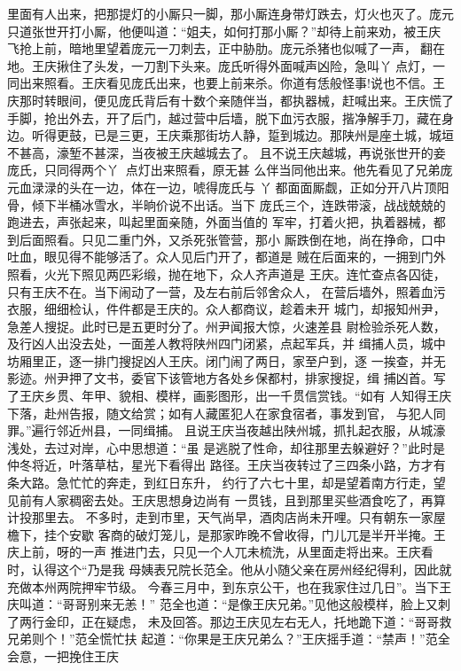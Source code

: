 里面有人出来，把那提灯的小厮只一脚，那小厮连身带灯跌去，灯火也灭了。庞元
只道张世开打小厮，他便叫道：“姐夫，如何打那小厮？”却待上前来劝，被王庆
飞抢上前，暗地里望着庞元一刀刺去，正中胁肋。庞元杀猪也似喊了一声，翻在
地。王庆揪住了头发，一刀割下头来。庞氏听得外面喊声凶险，急叫丫点灯，一
同出来照看。王庆看见庞氏出来，也要上前来杀。你道有恁般怪事!说也不信。王
庆那时转眼间，便见庞氏背后有十数个亲随伴当，都执器械，赶喊出来。王庆慌了
手脚，抢出外去，开了后门，越过营中后墙，脱下血污衣服，揩净解手刀，藏在身
边。听得更鼓，已是三更，王庆乘那街坊人静，踅到城边。那陕州是座土城，城垣
不甚高，濠堑不甚深，当夜被王庆越城去了。
且不说王庆越城，再说张世开的妾庞氏，只同得两个丫，点灯出来照看，原无甚
么伴当同他出来。他先看见了兄弟庞元血渌渌的头在一边，体在一边，唬得庞氏与
丫都面面厮觑，正如分开八片顶阳骨，倾下半桶冰雪水，半晌价说不出话。当下
庞氏三个，连跌带滚，战战兢兢的跑进去，声张起来，叫起里面亲随，外面当值的
军牢，打着火把，执着器械，都到后面照看。只见二重门外，又杀死张管营，那小
厮跌倒在地，尚在挣命，口中吐血，眼见得不能够活了。众人见后门开了，都道是
贼在后面来的，一拥到门外照看，火光下照见两匹彩缎，抛在地下，众人齐声道是
王庆。连忙查点各囚徒，只有王庆不在。当下闹动了一营，及左右前后邻舍众人，
在营后墙外，照着血污衣服，细细检认，件件都是王庆的。众人都商议，趁着未开
城门，却报知州尹，急差人搜捉。此时已是五更时分了。州尹闻报大惊，火速差县
尉检验杀死人数，及行凶人出没去处，一面差人教将陕州四门闭紧，点起军兵，并
缉捕人员，城中坊厢里正，逐一排门搜捉凶人王庆。闭门闹了两日，家至户到，逐
一挨查，并无影迹。州尹押了文书，委官下该管地方各处乡保都村，排家搜捉，缉
捕凶首。写了王庆乡贯、年甲、貌相、模样，画影图形，出一千贯信赏钱。“如有
人知得王庆下落，赴州告报，随文给赏；如有人藏匿犯人在家食宿者，事发到官，
与犯人同罪。”遍行邻近州县，一同缉捕。
且说王庆当夜越出陕州城，抓扎起衣服，从城濠浅处，去过对岸，心中思想道：“虽
是逃脱了性命，却往那里去躲避好？”此时是仲冬将近，叶落草枯，星光下看得出
路径。王庆当夜转过了三四条小路，方才有条大路。急忙忙的奔走，到红日东升，
约行了六七十里，却是望着南方行走，望见前有人家稠密去处。王庆思想身边尚有
一贯钱，且到那里买些酒食吃了，再算计投那里去。
不多时，走到市里，天气尚早，酒肉店尚未开哩。只有朝东一家屋檐下，挂个安歇
客商的破灯笼儿，是那家昨晚不曾收得，门儿兀是半开半掩。王庆上前，呀的一声
推进门去，只见一个人兀未梳洗，从里面走将出来。王庆看时，认得这个“乃是我
母姨表兄院长范全。他从小随父亲在房州经纪得利，因此就充做本州两院押牢节级。
今春三月中，到东京公干，也在我家住过几日”。当下王庆叫道：“哥哥别来无恙！”
范全也道：“是像王庆兄弟。”见他这般模样，脸上又刺了两行金印，正在疑虑，
未及回答。那边王庆见左右无人，托地跪下道：“哥哥救兄弟则个！”范全慌忙扶
起道：“你果是王庆兄弟么？”王庆摇手道：“禁声！”范全会意，一把挽住王庆
